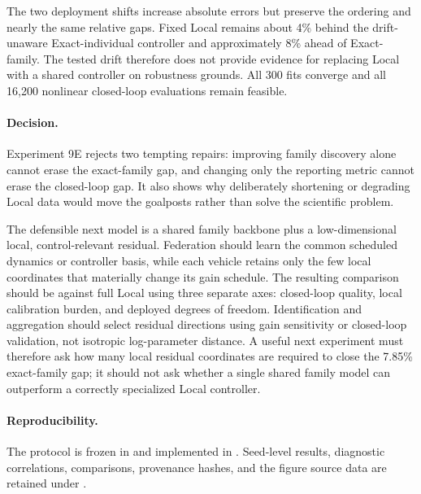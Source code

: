 The two deployment shifts increase absolute errors but preserve the ordering
and nearly the same relative gaps. Fixed Local remains about 4\% behind the
drift-unaware Exact-individual controller and approximately 8\% ahead of
Exact-family. The tested drift therefore does not provide evidence for replacing
Local with a shared controller on robustness grounds. All 300 fits converge and
all 16,200 nonlinear closed-loop evaluations remain feasible.

\paragraph{Decision.}
Experiment 9E rejects two tempting repairs: improving family discovery alone
cannot erase the exact-family gap, and changing only the reporting metric cannot
erase the closed-loop gap. It also shows why deliberately shortening or
degrading Local data would move the goalposts rather than solve the scientific
problem.

The defensible next model is a shared family backbone plus a low-dimensional
local, control-relevant residual. Federation should learn the common scheduled
dynamics or controller basis, while each vehicle retains only the few local
coordinates that materially change its gain schedule. The resulting comparison
should be against full Local using three separate axes: closed-loop quality,
local calibration burden, and deployed degrees of freedom. Identification and
aggregation should select residual directions using gain sensitivity or
closed-loop validation, not isotropic log-parameter distance. A useful next
experiment must therefore ask how many local residual coordinates are required
to close the 7.85\% exact-family gap; it should not ask whether a single shared
family model can outperform a correctly specialized Local controller.

\paragraph{Reproducibility.}
The protocol is frozen in  and implemented
in . Seed-level
results, diagnostic correlations, comparisons, provenance hashes, and the
figure source data are retained under .
